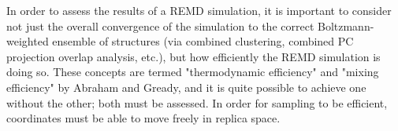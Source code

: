 
In order to assess the results of a REMD simulation, it is important to consider not just the overall convergence of the simulation to the correct Boltzmann-weighted ensemble of structures (via combined clustering, combined PC projection overlap analysis, etc.), but how efficiently the REMD simulation is doing so. These concepts are termed "thermodynamic efficiency" and "mixing efficiency" by Abraham and Gready,\citep{Abraham2008} and it is quite possible to achieve one without the other; both must be assessed. In order for sampling to be efficient, coordinates must be able to move freely in replica space. 

